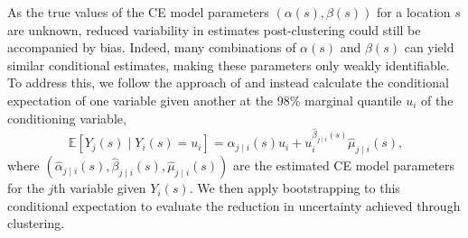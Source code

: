 \documentclass[
  12pt]{article}
\DeclareMathOperator{\CE}{\mathrm{CE}}
\begin{document}
As the true values of the CE model parameters $(\alpha(s), \beta(s))$ for a location $s$ are unknown, reduced variability in estimates post-clustering could still be accompanied by bias. 
Indeed, many combinations of $\alpha(s)$ and $\beta(s)$ can yield similar conditional estimates, making these parameters only weakly identifiable. 
To address this, we follow the approach of \citet{Richards2021-qm} and instead calculate the conditional expectation of one variable given another at the 98\% marginal quantile $u_i$ of the conditioning variable,  
\begin{equation}~\label{eq:boot}
  \mathbb{E}[Y_j(s) \mid Y_i(s) = u_i] = \hat{\alpha}_{j \mid i}(s) u_i + u_i^{\hat{\beta}_{j \mid i}(s)} \hat{\mu}_{j \mid i}(s),
\end{equation}
where $(\hat{\alpha}_{j \mid i}(s), \hat{\beta}_{j \mid i}(s), \hat{\mu}_{j \mid i}(s))$ are the estimated CE model parameters for the $j$th variable given $Y_i(s)$. 
We then apply bootstrapping to this conditional expectation to evaluate the reduction in uncertainty achieved through clustering. 
\end{document}
